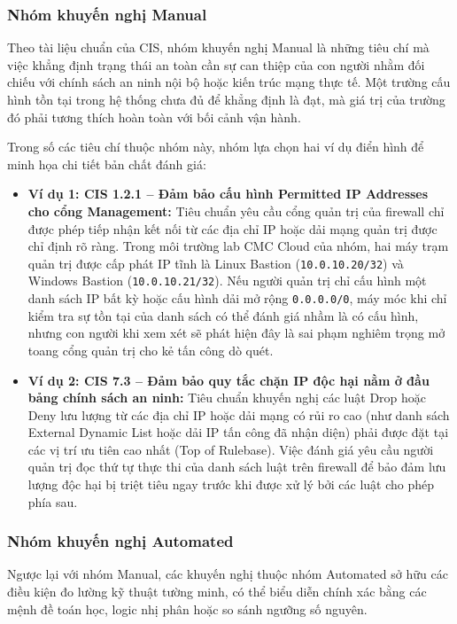 \documentclass[12pt,a4paper]{article}
\begin{document}
\subsubsection{Nhóm khuyến nghị Manual}
Theo tài liệu chuẩn của CIS, nhóm khuyến nghị Manual là những tiêu chí mà việc khẳng định trạng thái an toàn cần sự can thiệp của con người nhằm đối chiếu với chính sách an ninh nội bộ hoặc kiến trúc mạng thực tế. Một trường cấu hình tồn tại trong hệ thống chưa đủ để khẳng định là đạt, mà giá trị của trường đó phải tương thích hoàn toàn với bối cảnh vận hành.

Trong số các tiêu chí thuộc nhóm này, nhóm lựa chọn hai ví dụ điển hình để minh họa chi tiết bản chất đánh giá:
\begin{itemize}
    \item \textbf{Ví dụ 1: CIS 1.2.1 -- Đảm bảo cấu hình Permitted IP Addresses cho cổng Management:}
    Tiêu chuẩn yêu cầu cổng quản trị của firewall chỉ được phép tiếp nhận kết nối từ các địa chỉ IP hoặc dải mạng quản trị được chỉ định rõ ràng. Trong môi trường lab CMC Cloud của nhóm, hai máy trạm quản trị được cấp phát IP tĩnh là Linux Bastion (\texttt{10.0.10.20/32}) và Windows Bastion (\texttt{10.0.10.21/32}). Nếu người quản trị chỉ cấu hình một danh sách IP bất kỳ hoặc cấu hình dải mở rộng \texttt{0.0.0.0/0}, máy móc khi chỉ kiểm tra sự tồn tại của danh sách có thể đánh giá nhầm là có cấu hình, nhưng con người khi xem xét sẽ phát hiện đây là sai phạm nghiêm trọng mở toang cổng quản trị cho kẻ tấn công dò quét.
    \item \textbf{Ví dụ 2: CIS 7.3 -- Đảm bảo quy tắc chặn IP độc hại nằm ở đầu bảng chính sách an ninh:}
    Tiêu chuẩn khuyến nghị các luật Drop hoặc Deny lưu lượng từ các địa chỉ IP hoặc dải mạng có rủi ro cao (như danh sách External Dynamic List hoặc dải IP tấn công đã nhận diện) phải được đặt tại các vị trí ưu tiên cao nhất (Top of Rulebase). Việc đánh giá yêu cầu người quản trị đọc thứ tự thực thi của danh sách luật trên firewall để bảo đảm lưu lượng độc hại bị triệt tiêu ngay trước khi được xử lý bởi các luật cho phép phía sau.
\end{itemize}

\subsubsection{Nhóm khuyến nghị Automated}
Ngược lại với nhóm Manual, các khuyến nghị thuộc nhóm Automated sở hữu các điều kiện đo lường kỹ thuật tường minh, có thể biểu diễn chính xác bằng các mệnh đề toán học, logic nhị phân hoặc so sánh ngưỡng số nguyên. 
\end{document}
